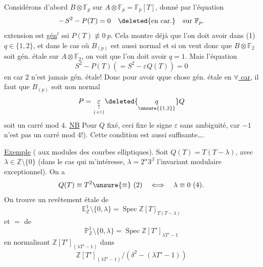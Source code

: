 Considérons d'abord  $B\otimes\mathbb F_p$ sur
$A\otimes\mathbb F_p=\mathbb F_p[T]$, donné
par l'équation
\[
-\,S^2-P(T)=0\quad \deleted{\text{en car.}}\quad\text{sur }\mathbb F_p.
\]
 extension est \uline{gén}$^t$ 
 ssi $P(T)\not\equiv0\ p$.
Cela montre déjà que  l'on doit avoir
dans (1) $q\in\{1,2\}$, et dans le cas où $B_{(p)}$ est aussi
normal  et si on veut donc que $B\otimes\mathbb F_2$ soit gén.
étale sur $A\otimes\mathbb F_2$, on voit que l'on doit avoir $q=1$.
Mais l'équation
\[
S^2-P(T)(=S^2-\varepsilon Q(T))=0
\]
en car $2$ n'est jamais gén. étale! Donc  pour
avoir qque chose gén. étale en \uline{$\forall$ car}, il faut que
$B_{(p)}$ soit non normal  
\[
P=\underset{\underset{\{\pm1\}}{\uparrow}}{\varepsilon}
\deleted{\underset{\unsure{\{1,2\}}}{q}}Q
\]
soit un carré
mod $4$. \uline{NB} Pour $Q$ fixé, ceci fixe le signe $\varepsilon$ sans
ambiguité, car $-1$ n'est pas un carré mod $4$!). Cette
condition est aussi suffisante\ldots.

\uline{Exemple} ( aux modules des courbes elliptiques). Soit
$Q(T)=T(T-\lambda)$, avec $\lambda\in\mathbb Z\setminus\{0\}$
(dans le cas qui m'intéresse, \deleted{$\unsure{\lambda}$}
$\lambda=2^\alpha3^\beta$ l'invariant modulaire exceptionnel). On a
\[
Q(T)\equiv T^2\unsure{\equiv}\ (2)\quad\Longleftrightarrow\quad
\lambda\equiv0\ (4).
\]
On trouve
un revêtement étale de
\[
\mathbb E^1_{\mathbb Z}\setminus\{0,\lambda\}
=\operatorname{Spec}\mathbb Z[T]_{T(T-\lambda)}
\]
et $=$ de
\[
\mathbb P^1_{\mathbb Z}\setminus\{0,\lambda\}
=\operatorname{Spec}\mathbb Z[T']_{\lambda T'-1}
\]
en normalisant $\mathbb Z[T']_{(\lambda T'-1)}$ dans
\[
\mathbb Z[T']_{(\lambda T'-1)}/(\delta^2-(\lambda T'-1))
\]
